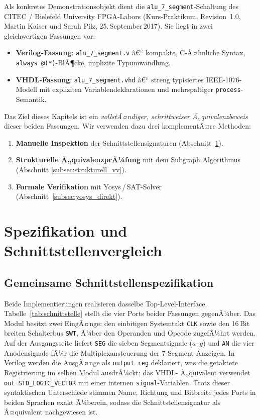﻿\documentclass[12pt,a4paper]{report}
\begin{document}
Als konkretes Demonstrationsobjekt dient die \texttt{alu\_7\_segment}-Schaltung
des CITEC / Bielefeld University FPGA-Labors (Kurs-Praktikum, Revision~1.0,
Martin Kaiser und Sarah Pilz, 25.\,September\,2017).  Sie liegt in zwei
gleichwertigen Fassungen vor:

\begin{itemize}
	\item \textbf{Verilog-Fassung}: \texttt{alu\_7\_segment.v} â€“
	kompakte, C-Ã¤hnliche Syntax, \texttt{always\,@(*)}-BlÃ¶cke,
	implizite Typumwandlung.
	\item \textbf{VHDL-Fassung}: \texttt{alu\_7\_segment.vhd} â€“
	streng typisiertes IEEE-1076-Modell mit expliziten
	Variablendeklarationen und mehrspaltiger \texttt{process}-Semantik.
\end{itemize}

Das Ziel dieses Kapitels ist ein \emph{vollstÃ¤ndiger, schrittweiser
	Ã„quivalenzbeweis} dieser beiden Fassungen.  Wir verwenden dazu drei
komplementÃ¤re Methoden:

\begin{enumerate}
	\item \textbf{Manuelle Inspektion} der Schnittstellensignaturen (Abschnitt~\ref{subsec:schnittstellenvergleich}).
	\item \textbf{Strukturelle Ã„quivalenzprÃ¼fung} mit dem Subgraph Algorithmus
	\cite{subgraph2026} (Abschnitt \ref{subsec:strukturell_vv}).
	\item \textbf{Formale Verifikation} mit Yosys\,/\,SAT-Solver
	(Abschnitt~\ref{subsec:yosys_direkt}).
\end{enumerate}

\section{Spezifikation und Schnittstellenvergleich}
\label{subsec:schnittstellenvergleich}

\subsection{Gemeinsame Schnittstellenspezifikation}

Beide Implementierungen realisieren dasselbe Top-Level-Interface.
Tabelle~\ref{tab:schnittstelle} stellt die vier Ports beider Fassungen gegenÃ¼ber.
Das Modul besitzt zwei EingÃ¤nge: den einbitigen Systemtakt \texttt{CLK} sowie den
16\,Bit breiten Schalterbus \texttt{SWT}, Ã¼ber den Operanden und Opcode zugefÃ¼hrt
werden.  Auf der Ausgangsseite liefert \texttt{SEG} die sieben Segmentsignale
($a$--$g$) und \texttt{AN} die vier Anodensignale fÃ¼r die Multiplexansteuerung der
7-Segment-Anzeigen.  In Verilog werden die AusgÃ¤nge als \texttt{output~reg}
deklariert, was die getaktete Registrierung im selben Modul ausdrÃ¼ckt; das VHDL-
Ã„quivalent verwendet \texttt{out~STD\_LOGIC\_VECTOR} mit einer internen
\texttt{signal}-Variablen.  Trotz dieser syntaktischen Unterschiede stimmen Name,
Richtung und Bitbreite jedes Ports in beiden Sprachen exakt Ã¼berein, sodass die
Schnittstellensignatur als Ã¤quivalent nachgewiesen ist.
\end{document}
